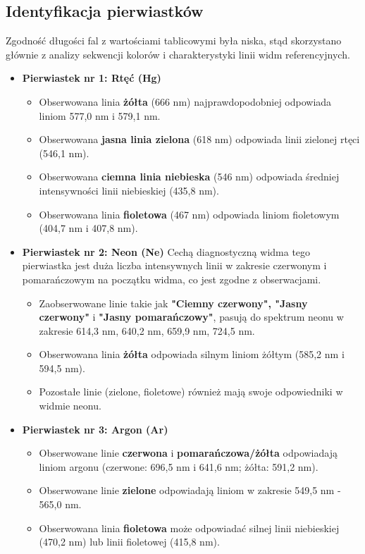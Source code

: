 \documentclass[a4paper,12pt]{article}
\begin{document}
\subsection{Identyfikacja pierwiastków}

Zgodność długości fal z wartościami tablicowymi była niska, stąd skorzystano głównie z analizy sekwencji kolorów i charakterystyki linii widm referencyjnych.

\begin{itemize}
    \item \textbf{Pierwiastek nr 1: Rtęć (Hg)}
          \begin{itemize}
              \item Obserwowana linia \textbf{żółta} (666 nm) najprawdopodobniej odpowiada liniom 577,0 nm i 579,1 nm.
              \item Obserwowana \textbf{jasna linia zielona} (618 nm) odpowiada linii zielonej rtęci (546,1 nm).
              \item Obserwowana \textbf{ciemna linia niebieska} (546 nm) odpowiada średniej intensywności linii niebieskiej (435,8 nm).
              \item Obserwowana linia \textbf{fioletowa} (467 nm) odpowiada liniom fioletowym (404,7 nm i 407,8 nm).
          \end{itemize}

    \item \textbf{Pierwiastek nr 2: Neon (Ne)}
          Cechą diagnostyczną widma tego pierwiastka jest duża liczba intensywnych linii w zakresie czerwonym i pomarańczowym na początku widma, co jest zgodne z obserwacjami.
          \begin{itemize}
              \item Zaobserwowane linie takie jak \textbf{"Ciemny czerwony", "Jasny czerwony"} i \textbf{"Jasny pomarańczowy"}, pasują do spektrum neonu w zakresie 614,3 nm, 640,2 nm, 659,9 nm, 724,5 nm.
              \item Obserwowana linia \textbf{żółta} odpowiada silnym liniom żółtym (585,2 nm i 594,5 nm).
              \item Pozostałe linie (zielone, fioletowe) również mają swoje odpowiedniki w widmie neonu.
          \end{itemize}

    \item \textbf{Pierwiastek nr 3: Argon (Ar)}
          \begin{itemize}
              \item Obserwowane linie \textbf{czerwona} i \textbf{pomarańczowa/żółta} odpowiadają liniom argonu (czerwone: 696,5 nm i 641,6 nm; żółta: 591,2 nm).
              \item Obserwowane linie \textbf{zielone} odpowiadają liniom w zakresie 549,5 nm - 565,0 nm.
              \item Obserwowana linia \textbf{fioletowa} może odpowiadać silnej linii niebieskiej (470,2 nm) lub linii fioletowej (415,8 nm).
          \end{itemize}
\end{itemize}
\end{document}

